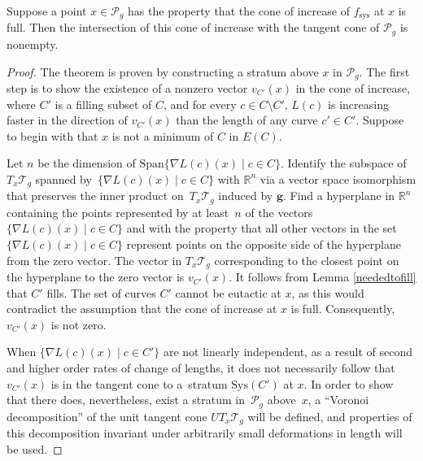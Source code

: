 \begin{Theorem}
\label{balancedthm2}
Suppose a point $x\in \mathcal{P}_{g}$ has the property that the cone of increase of $f_{\mathrm{sys}}$ at $x$ is full. Then the intersection of this cone of increase with the tangent cone of $\mathcal{P}_{g}$ is nonempty.
\end{Theorem}
\begin{proof}
The theorem is proven by constructing a stratum above $x$ in $\mathcal{P}_{g}$. The first step is to show the existence of a nonzero vector $v_{C'}(x)$ in the cone of increase, where $C'$ is a filling subset of $C$, and for every $c\in C\setminus C'$, $L(c)$ is increasing faster in the direction of $v_{C'}(x)$ than the length of any curve $c'\in C'$. Suppose to begin with that $x$ is not a minimum of $C$ in $E(C)$.

Let $n$ be the dimension of $\mathrm{Span}\{\nabla L(c)(x) \mid c\in C\}$. Identify the subspace of $T_{x}\mathcal{T}_{g}$ spanned by~$\{\nabla L(c)(x) \mid c\in C\}$ with $\mathbb{R}^{n}$ via a vector space isomorphism that preserves the inner product on~$T_{x}\mathcal{T}_{g}$ induced by $\mathbf{g}$. Find a hyperplane in $\mathbb{R}^{n}$ containing the points represented by at least~$n$ of the vectors $\{\nabla L(c)(x) \mid c\in C\}$ and with the property that all other vectors in the set~$\{\nabla L(c)(x) \mid c\in C\}$ represent points on the opposite side of the hyperplane from the zero vector. The vector in $T_{x}\mathcal{T}_{g}$ corresponding to the closest point on the hyperplane to the zero vector is $v_{C'}(x)$. It follows from Lemma \ref{neededtofill} that $C'$ fills. The set of curves $C'$ cannot be eutactic at $x$, as this would contradict the assumption that the cone of increase at $x$ is full. Consequently, $v_{C'}(x)$ is not zero.

When $\{\nabla L(c)(x) \mid c\in C'\}$ are not linearly independent, as a result of second and higher order rates of change of lengths, it does not necessarily follow that $v_{C'}(x)$ is in the tangent cone to a~stratum $\mathrm{Sys}(C')$ at $x$. In order to show that there does, nevertheless, exist a stratum in~$\mathcal{P}_{g}$ above~$x$, a ``Voronoi decomposition'' of the unit tangent cone $UT_{x}\mathcal{T}_{g}$ will be defined, and properties of this decomposition invariant under arbitrarily small deformations in length will be used.


\end{proof}
